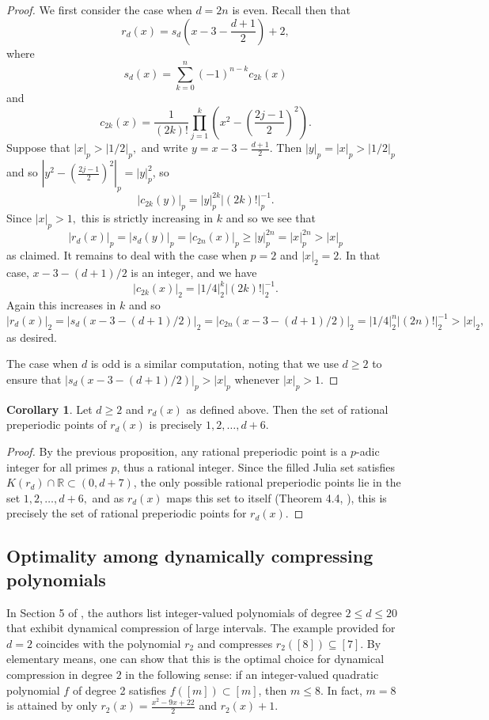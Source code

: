 \documentclass[12pt]{amsart}
\theoremstyle{definition}
\newtheorem{corollary}[theorem]{Corollary}
\begin{document}
\begin{proof} We first consider the case when $d = 2n$ is even.  Recall then that
$$r_d(x) = s_d\left(x-3-\frac{d+1}{2}\right) + 2,$$
where
$$s_{d}(x) = \sum_{k=0}^{n}(-1)^{n-k}c_{2k}(x)$$
and
$$c_{2k}(x) = \frac{1}{(2k)!}\prod_{j=1}^{k} \left(x^2-\left(\frac{2j-1}{2}\right)^2\right).$$
Suppose that $|x|_p > |1/2|_p,$ and write $y =x-3-\frac{d+1}{2}.$  Then $|y|_p = |x|_p > |1/2|_p$ and so $\left| y^2 - \left( \frac{2j-1}{2} \right)^2 \right|_p = |y|_p^2$, so 
$$|c_{2k}(y)|_p = |y|_p^{2k} |(2k)!|_p^{-1}.$$
Since $|x|_p > 1,$ this is strictly increasing in $k$ and so we see that 
$$|r_d(x)|_p =|s_d(y)|_p = |c_{2n}(x)|_p \geq |y|^{2n}_p = |x|_p^{2n}> |x|_p$$
as claimed.  It remains to deal with the case when $p = 2$ and $|x|_2 = 2.$  In that case, $x - 3 - (d+1)/2$ is an integer, and we have
$$|c_{2k}(x)|_2 = |1/4|^{k}_2 |(2k)!|^{-1}_2.$$
Again this increases in $k$ and so 
$$|r_d(x)|_2 = |s_d(x-3-(d+1)/2)|_2 = |c_{2n}(x-3-(d+1)/2)|_2 = |1/4|^{n}_2 |(2n)!|^{-1}_2 > |x|_2,$$
as desired.

The case when $d$ is odd is a similar computation, noting that we use $d \geq 2$ to ensure that $|s_d(x-3-(d+1)/2)|_p > |x|_p$ whenever $|x|_p > 1.$

\end{proof}

\begin{corollary} Let $d \geq 2$ and $r_d(x)$ as defined above.  Then the set of rational preperiodic points of $r_d(x)$ is precisely ${1, 2, \dots, d+6}$.
\end{corollary}

\begin{proof} By the previous proposition, any rational preperiodic point is a $p$-adic integer for all primes $p$, thus a rational integer.  Since the filled Julia set satisfies $K(r_d) \cap \mathbb{R} \subset (0,d+7)$, the only possible rational preperiodic points lie in the set ${1, 2, \dots, d+6},$ and as $r_d(x)$ maps this set to itself (Theorem 4.4, \cite{doyle2022polynomialsrationalpreperiodicpoints}), this is precisely the set of rational preperiodic points for $r_d(x)$.
\end{proof}

\subsection{Optimality among dynamically compressing polynomials}


In Section 5 of \cite{doyle2022polynomialsrationalpreperiodicpoints}, the authors list integer-valued polynomials of degree $2\leq d\leq 20$ that exhibit dynamical compression of large intervals. The example provided for $d=2$ coincides with the polynomial $r_2$ and compresses $r_2([8])\subseteq [7]$. By elementary means, one can show that this is the optimal choice for dynamical compression in degree $2$ in the following sense: if an integer-valued quadratic polynomial $f$ of degree 2 satisfies $f([m])\subset [m]$, then $m\leq 8$. In fact, $m=8$ is attained by only $r_2(x)=\frac{x^2-9x+22}{2}$ and $r_2(x)+1$.
\end{document}
